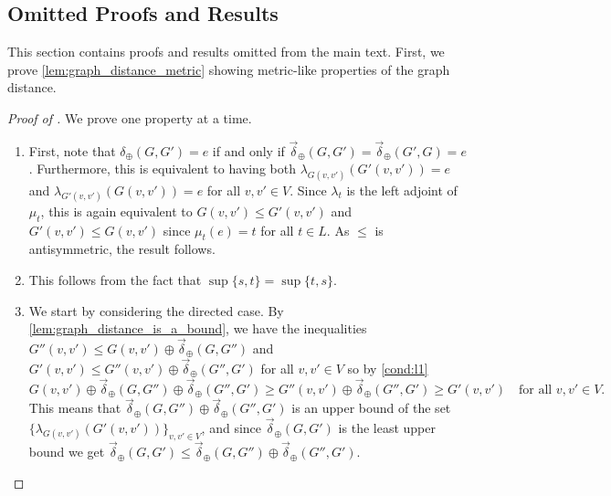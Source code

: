 \documentclass[a4paper,11pt]{article}
\newcommand{\atensor}{\oplus}
\theoremstyle{remark}
\newenvironment{cleverproof}[1]
  {\begin{proof}[Proof of \Cref{#1}]}
  {\end{proof}}
\begin{document}
\begin{appendices}
\FloatBarrier

\subsection{Omitted Proofs and Results}\label{sec:proofs_appendix}
This section contains proofs and results omitted from the main text. First, we prove \cref{lem:graph_distance_metric} showing metric-like properties of the graph distance.
\begin{cleverproof}{lem:graph_distance_metric}\label{proof:graph_distance_metric}
We prove one property at a time.
  \begin{enumerate}[wide, labelindent=0pt]
    \item First, note that $\delta_\atensor(G,G')=e$ if and only if $\vec{\delta}_\atensor(G,G')=\vec{\delta}_\atensor(G',G)=e$. Furthermore, this is equivalent to having both $\lambda_{G(v,v')}\left(G'(v,v')\right)=e$ and $\lambda_{G'(v,v')}\left(G(v,v')\right)=e$ for all $v,v'\in V$. Since $\lambda_t$ is the left adjoint of $\mu_t$, this is again equivalent to $G(v,v')\leq G'(v,v')$ and $G'(v,v')\leq G(v,v')$ since $\mu_t(e)=t$ for all $t\in L$. As $\leq$ is antisymmetric, the result follows.
    \item This follows from the fact that $\sup\{s,t\}=\sup\{t,s\}$. %
    \item We start by considering the directed case. By \cref{lem:graph_distance_is_a_bound}, we have the inequalities $G''(v,v')\leq G(v,v')\atensor\vec{\delta}_\atensor(G,G'')$ and $G'(v,v')\leq G''(v,v')\atensor\vec{\delta}_\atensor(G'',G')$ for all $v,v'\in V$ so by \ref{cond:l1}
    \begin{equation*}
    G(v,v')\atensor \vec{\delta}_\atensor(G,G'')\atensor \vec{\delta}_\atensor(G'',G')\geq G''(v,v')\atensor \vec{\delta}_\atensor(G'',G')\geq G'(v,v')\quad\text{for all }v,v'\in V. 
    \end{equation*}
    This means that $\vec{\delta}_\atensor(G,G'')\atensor \vec{\delta}_\atensor(G'',G')$ is an upper bound of the set $\{\lambda_{G(v,v')}\left(G'(v,v')\right)\}_{v,v'\in V}$, and since $\vec{\delta}_\atensor(G,G')$ is the least upper bound we get $\vec{\delta}_\atensor(G,G')\leq\vec{\delta}_\atensor(G,G'')\atensor\vec{\delta}_\atensor(G'',G')$.
    

\end{enumerate}
\end{cleverproof}
\end{appendices}
\end{document}
